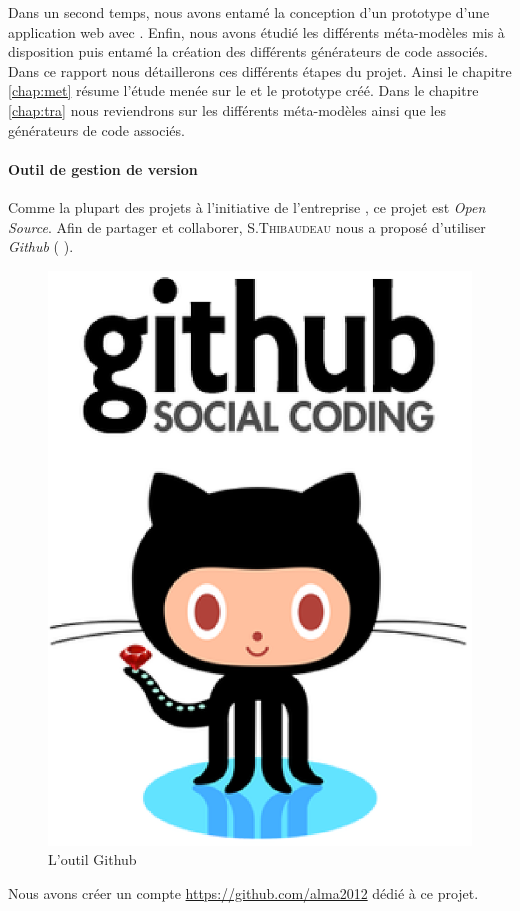 \clearpage

Dans un second temps, nous avons entamé la conception d'un prototype d'une application web avec \kwplay{}. Enfin, nous avons étudié les différents méta-modèles mis à disposition puis entamé la création des différents générateurs de code associés. Dans ce rapport nous détaillerons ces différents étapes du projet. Ainsi le chapitre \ref{chap:met} résume l'étude menée sur le \kwplay{} et le prototype créé. Dans le chapitre \ref{chap:tra} nous reviendrons sur les différents méta-modèles ainsi que les générateurs de code associés. 

\paragraph{Outil de gestion de version}
Comme la plupart des projets à l'initiative de l'entreprise \kwobeo, ce projet est \textit{Open Source}. Afin de partager et collaborer, S.\textsc{Thibaudeau} nous a proposé d'utiliser \emph{Github} (\cf{} \cite{git}).%
\begin{figure}[htb]
  \centering
  \includegraphics[scale=.3]{img/git.eps}
  \caption{L'outil Github}
\end{figure}
Nous avons créer un compte \href{alma2012}{https://github.com/alma2012} dédié à ce projet.


